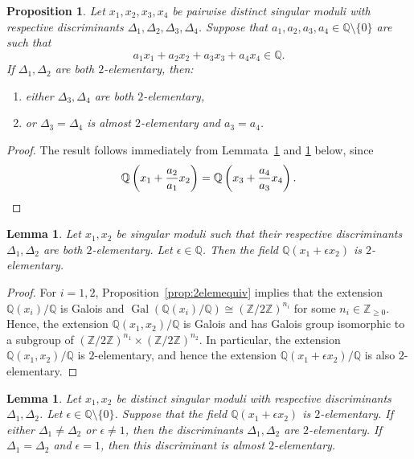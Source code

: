 \documentclass[12pt,a4paper,oneside]{amsart}
\newtheorem{lemma}[theorem]{Lemma}
\newtheorem{proposition}[theorem]{Proposition}
\DeclareMathOperator{\gal}{Gal}
\begin{document}
  \begin{proposition}\label{lem:all2elem}
    Let $x_1, x_2, x_3, x_4$ be pairwise distinct singular moduli with respective discriminants $\Delta_1, \Delta_2, \Delta_3, \Delta_4$. Suppose that $a_1, a_2, a_3, a_4 \in \mathbb{Q} \setminus \{0\}$ are such that
    \[ a_1 x_1 + a_2 x_2 + a_3 x_3 + a_4 x_4 \in \mathbb{Q}.\]
   If $\Delta_1, \Delta_2$ are both $2$-elementary, then:
    \begin{enumerate}
        \item either $\Delta_3, \Delta_4$ are both $2$-elementary,
        \item or $\Delta_3 = \Delta_4$ is almost $2$-elementary and $a_3 = a_4$.
    \end{enumerate}
   \end{proposition}
   
   \begin{proof}
      The result follows immediately from Lemmata~\ref{lem:compositum2elem} and \ref{lem:almost2elem} below, since
       \[ \mathbb{Q}\left(x_1 + \frac{a_2}{a_1} x_2\right) = \mathbb{Q}\left(x_3 + \frac{a_4}{a_3} x_4\right). \qedhere\]
   \end{proof}


\begin{lemma}\label{lem:compositum2elem}
Let $x_1, x_2$ be singular moduli such that their respective discriminants $\Delta_1, \Delta_2$ are both $2$-elementary. Let $\epsilon \in \mathbb{Q}$. Then the field $\mathbb{Q}(x_1 + \epsilon x_2)$ is $2$-elementary.
\end{lemma}

\begin{proof}
    For $i=1,2$, Proposition~\ref{prop:2elemequiv} implies that the extension $\mathbb{Q}(x_i) / \mathbb{Q}$ is Galois and $ \gal \left(\mathbb{Q}\left(x_i\right) / \mathbb{Q}\right) \cong (\mathbb{Z}/ 2 \mathbb{Z})^{n_i}$ for some $n_i \in \mathbb{Z}_{ \geq 0}$. Hence, the extension $\mathbb{Q}(x_1, x_2) / \mathbb{Q}$ is Galois and has Galois group isomorphic to a subgroup of $(\mathbb{Z}/ 2 \mathbb{Z})^{n_1} \times (\mathbb{Z}/ 2 \mathbb{Z})^{n_2}$. In particular, the extension  $\mathbb{Q}(x_1, x_2) / \mathbb{Q}$ is $2$-elementary, and hence the extension $\mathbb{Q}(x_1 + \epsilon x_2) / \mathbb{Q}$ is also $2$-elementary.
\end{proof}


    
    \begin{lemma}\label{lem:almost2elem}
    Let $x_1, x_2$ be distinct singular moduli with respective discriminants $\Delta_1, \Delta_2$. Let $\epsilon \in \mathbb{Q} \setminus \{0\}$. Suppose that the field $\mathbb{Q}(x_1 + \epsilon x_2)$ is $2$-elementary. If either $\Delta_1 \neq \Delta_2$ or $\epsilon \neq 1$, then the discriminants $\Delta_1, \Delta_2$ are $2$-elementary. If $\Delta_1 = \Delta_2$ and $\epsilon = 1$, then this discriminant is almost $2$-elementary. 
    \end{lemma}
    
\end{document}
